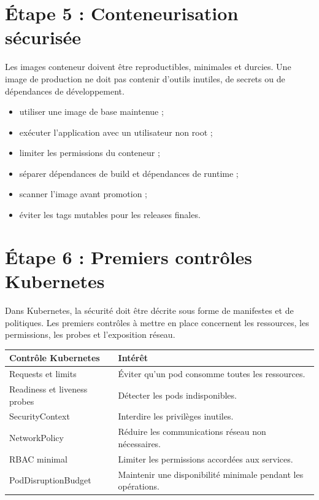 \documentclass[12pt,a4paper]{article}
\begin{document}
\section{Étape 5 : Conteneurisation sécurisée}

Les images conteneur doivent être reproductibles, minimales et durcies. Une
image de production ne doit pas contenir d'outils inutiles, de secrets ou de
dépendances de développement.

\begin{itemize}[leftmargin=*]
  \item utiliser une image de base maintenue ;
  \item exécuter l'application avec un utilisateur non root ;
  \item limiter les permissions du conteneur ;
  \item séparer dépendances de build et dépendances de runtime ;
  \item scanner l'image avant promotion ;
  \item éviter les tags mutables pour les releases finales.
\end{itemize}

\section{Étape 6 : Premiers contrôles Kubernetes}

Dans Kubernetes, la sécurité doit être décrite sous forme de manifestes et de
politiques. Les premiers contrôles à mettre en place concernent les ressources,
les permissions, les probes et l'exposition réseau.

\begin{longtable}{|p{5cm}|p{8cm}|}
\hline
\textbf{Contrôle Kubernetes} & \textbf{Intérêt} \\
\hline
Requests et limits & Éviter qu'un pod consomme toutes les ressources. \\
\hline
Readiness et liveness probes & Détecter les pods indisponibles. \\
\hline
SecurityContext & Interdire les privilèges inutiles. \\
\hline
NetworkPolicy & Réduire les communications réseau non nécessaires. \\
\hline
RBAC minimal & Limiter les permissions accordées aux services. \\
\hline
PodDisruptionBudget & Maintenir une disponibilité minimale pendant les
opérations. \\
\hline
\end{longtable}
\end{document}
